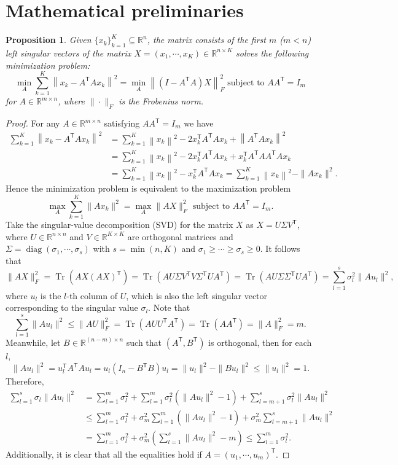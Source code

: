 \documentclass{article}
\newtheorem{Prop}{Proposition}[section]
\newcommand{\mR}{\mathbb{R}}
\newcommand{\trans}{\mathsf{T}}
\DeclareMathOperator*{\diag}{diag}
\DeclareMathOperator*{\tr}{Tr}
\begin{document}
\section{Mathematical preliminaries}
\begin{Prop}\label{prop:pod_optimality}
	Given $\{x_k\}_{k=1}^K\subseteq\mR^n$, the matrix consists of the first $m$ ($m<n$) left singular vectors of the matrix $X=(x_1,\cdots,x_K)\in\mR^{n\times K}$ solves the following minimization problem:
	\[\min_A\sum_{k=1}^K\left\|x_k-A^\trans A x_k\right\|^2=\min_A\left\|(I-A^\trans A)X\right\|_F^2\textrm{ subject to }AA^\trans=I_m\]
	for $A\in\mR^{m\times n}$, where $\|\cdot\|_F$ is the Frobenius norm.
\end{Prop}
\begin{proof}
	For any $A\in\mR^{m\times n}$ satisfying $AA^\trans=I_m$ we have
	\begin{align*}
		\sum_{k=1}^K\left\|x_k-A^\trans A x_k\right\|^2 & =\sum_{k=1}^K\left\|x_k\right\|^2-2x_k^\trans A^\trans Ax_k+\left\|A^\trans A x_k\right\|^2             \\
		                                                & =\sum_{k=1}^K\left\|x_k\right\|^2-2x_k^\trans A^\trans Ax_k+x_k^\trans A^\trans AA^\trans A x_k         \\
		                                                & =\sum_{k=1}^K\left\|x_k\right\|^2-x_k^\trans A^\trans Ax_k=\sum_{k=1}^K\left\|x_k\right\|^2-\|Ax_k\|^2.
	\end{align*}
	Hence the minimization problem is equivalent to the maximization problem
	\[\max_A\sum_{k=1}^K\|Ax_k\|^2=\max_A\|AX\|_F^2\textrm{ subject to }AA^\trans=I_m.\]
	Take the singular-value decomposition (SVD) for the matrix $X$ as $X=U\Sigma V^\trans$, where $U\in\mR^{n\times n}$ and $V\in\mR^{K\times K}$ are orthogonal matrices and $\Sigma=\diag(\sigma_1,\cdots,\sigma_s)$ with $s=\min(n,K)$ and $\sigma_1\geq\cdots\geq\sigma_s\geq0$. It follows that
	\[\|AX\|_F^2=\tr\left(AX(AX)^\trans\right)=\tr\left(AU\Sigma V^\trans V\Sigma^\trans UA^\trans\right)=\tr\left(AU\Sigma\Sigma^\trans UA^\trans\right)=\sum_{l=1}^s\sigma_l^2\|Au_l\|^2,\]
	where $u_l$ is the $l$-th column of $U$, which is also the left singular vector corresponding to the singular value $\sigma_l$. Note that
	\[\sum_{l=1}^s\|Au_l\|^2\le\|AU\|_F^2=\tr(AUU^\trans A^\trans)=\tr(AA^\trans)=\|A\|_F^2=m.\]
	Meanwhile, let $B\in\mR^{(n-m)\times n}$ such that $(A^\trans, B^\trans)$ is orthogonal, then for each $l$,
	\[\|Au_l\|^2=u_l^\trans A^\trans Au_l=u_l(I_n-B^\trans B)u_l=\|u_l\|^2-\|Bu_l\|^2\le\|u_l\|^2=1.\]
	Therefore,
	\begin{align*}
		\sum_{l=1}^s\sigma_l\|Au_l\|^2 & =\sum_{l=1}^m\sigma_l^2+\sum_{l=1}^m\sigma_l^2\left(\|Au_l\|^2-1\right)+\sum_{l=m+1}^s\sigma_l^2\|Au_l\|^2   \\
		                               & \le\sum_{l=1}^m\sigma_l^2+\sigma_m^2\sum_{l=1}^m\left(\|Au_l\|^2-1\right)+\sigma_m^2\sum_{l=m+1}^s\|Au_l\|^2 \\
		                               & =\sum_{l=1}^m\sigma_l^2+\sigma_m^2\left(\sum_{l=1}^s\|Au_l\|^2-m\right)\le\sum_{l=1}^m\sigma_l^2.
	\end{align*}
	Additionally, it is clear that all the equalities hold if $A=(u_1,\cdots,u_m)^\trans$.
\end{proof}
\end{document}
